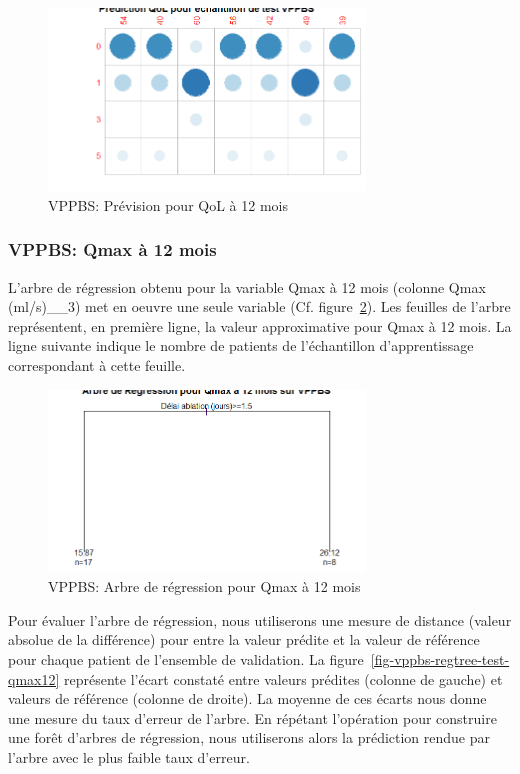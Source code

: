 \begin{figure}[H]
\centering
\includegraphics[width=0.75\textwidth]{../Fig/VPPBS/vppbs-regtree-predict-qol12.png}
\caption{VPPBS: Prévision pour QoL à 12 mois}
\label{fig-vppbs-regtree-predict-qol12}
\end{figure}


\subsubsection{VPPBS: Qmax à 12 mois}

L'arbre de régression obtenu pour la variable Qmax à 12 mois (colonne Qmax (ml/s)\_\_3) met en oeuvre une seule variable (Cf. figure~\ref{fig-vppbs-regtree-qmax12}). Les feuilles de l'arbre représentent, en première ligne, la valeur approximative pour Qmax à 12 mois. La ligne suivante indique le nombre de patients de l'échantillon d'apprentissage correspondant à cette feuille. 

\begin{figure}[H]
\centering
\includegraphics[width=0.75\textwidth]{../Fig/VPPBS/vppbs-regtree-qmax12.png}
\caption{VPPBS: Arbre de régression pour Qmax à 12 mois}
\label{fig-vppbs-regtree-qmax12}
\end{figure}

Pour évaluer l'arbre de régression, nous utiliserons une mesure de distance (valeur absolue de la différence) pour entre la valeur prédite et la valeur de référence pour chaque patient de l'ensemble de validation. 
La figure~\ref{fig-vppbs-regtree-test-qmax12} représente l'écart constaté entre valeurs prédites (colonne de gauche) et valeurs de référence (colonne de droite). La moyenne de ces écarts nous donne une mesure du taux d'erreur de l'arbre. En répétant l'opération pour construire une forêt d'arbres de régression, nous utiliserons alors la prédiction rendue par l'arbre avec le plus faible taux d'erreur.

